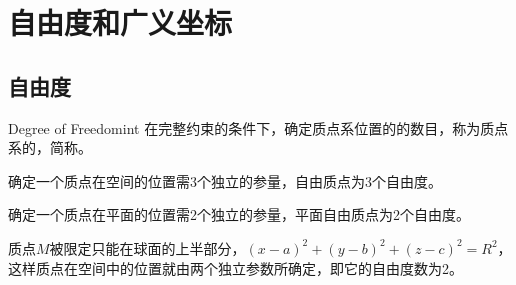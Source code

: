 \section{自由度和广义坐标}

\subsection{自由度}

\begin{definition}{Degree of Freedom}{int}
	在完整约束的条件下，确定质点系位置的的数目，称为质点系的，简称。
\end{definition}

\begin{example}
	确定一个质点在空间的位置需3个独立的参量，自由质点为3个自由度。
\end{example}
\begin{example}	
	确定一个质点在平面的位置需2个独立的参量，平面自由质点为2个自由度。	
\end{example}
\begin{example}	
	质点$M$被限定只能在球面的上半部分，${{(x-a)}^{2}}+{{(y-b)}^{2}}+{{(z-c)}^{2}}={{R}^{2}}$，这样质点在空间中的位置就由两个独立参数所确定，即它的自由度数为2。
\end{example}